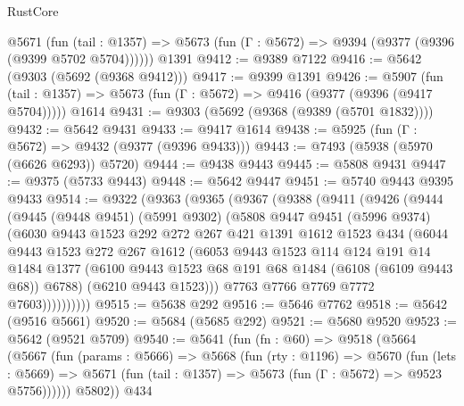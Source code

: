 \begin{lexlean}{RustCore}
\begin{coremodule}
    @5671
      (fun (tail : @1357) => @5673 (fun (Γ : @5672) => @9394 (@9377 (@9396 (@9399 @5702 @5704))))))
    @1391
@9412 := @9389 @7122
@9416 := @5642 (@9303 (@5692 (@9368 @9412)))
@9417 := @9399 @1391
@9426 := @5907
    (fun (tail : @1357) => @5673 (fun (Γ : @5672) => @9416 (@9377 (@9396 (@9417 @5704)))))
    @1614
@9431 := @9303 (@5692 (@9368 (@9389 (@5701 @1832))))
@9432 := @5642 @9431
@9433 := @9417 @1614
@9438 := @5925 (fun (Γ : @5672) => @9432 (@9377 (@9396 @9433)))
@9443 := @7493 (@5938 (@5970 (@6626 @6293)) @5720)
@9444 := @9438 @9443
@9445 := @5808 @9431
@9447 := @9375 (@5733 @9443)
@9448 := @5642 @9447
@9451 := @5740 @9443 @9395 @9433
@9514 := @9322
    (@9363
      (@9365
        (@9367
          (@9388
            (@9411
              (@9426
                (@9444
                  (@9445
                    (@9448 @9451)
                    (@5991 @9302)
                    (@5808
                      @9447
                      @9451
                      (@5996 @9374)
                      (@6030
                        @9443
                        @1523
                        @292
                        @272
                        @267
                        @421
                        @1391
                        @1612
                        @1523
                        @434
                        (@6044
                          @9443
                          @1523
                          @272
                          @267
                          @1612
                          (@6053
                            @9443
                            @1523
                            @114
                            @124
                            @191
                            @14
                            @1484
                            @1377
                            (@6100 @9443 @1523 @68 @191 @68 @1484 (@6108 (@6109 @9443 @68)) @6788)
                            (@6210 @9443 @1523)))
                        @7763
                        @7766
                        @7769
                        @7772
                        @7603))))))))))
@9515 := @5638 @292
@9516 := @5646 @7762
@9518 := @5642 (@9516 @5661)
@9520 := @5684 (@5685 @292)
@9521 := @5680 @9520
@9523 := @5642 (@9521 @5709)
@9540 := @5641
    (fun (fn : @60) =>
    @9518
      (@5664
        (@5667
          (fun (params : @5666) =>
          @5668
            (fun (rty : @1196) =>
            @5670
              (fun (lets : @5669) =>
              @5671 (fun (tail : @1357) => @5673 (fun (Γ : @5672) => @9523 @5756))))))
        @5802))
    @434

\end{coremodule}
\end{lexlean}
